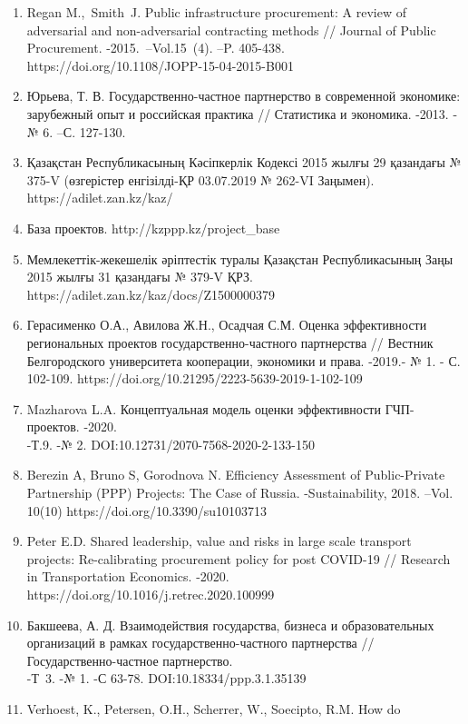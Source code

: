 \begin{enumerate}
\def\labelenumi{\arabic{enumi}.}
\item
  Regan M.,~Smith~J. Public infrastructure procurement: A review of
  adversarial and non-adversarial contracting methods // Journal of
  Public Procurement. -2015.~--Vol.15~(4). --P. 405-438.
  https://doi.org/10.1108/JOPP-15-04-2015-B001
\item
  Юрьева, Т. В. Государственно-частное партнерство в современной
  экономике: зарубежный опыт и российская практика // Статистика и
  экономика. -2013. -№ 6. --С. 127-130.
\item
  Қазақстан Республикасының Кәсіпкерлік Кодексі 2015 жылғы 29 қазандағы
  № 375-V (өзгерістер енгізілді-ҚР 03.07.2019 № 262-VI Заңымен).
  https://adilet.zan.kz/kaz/
\item
  База проектов. http://kzppp.kz/project\_base
\item
  Мемлекеттік-жекешелік әріптестік туралы Қазақстан Республикасының Заңы
  2015 жылғы 31 қазандағы № 379-V ҚРЗ.
  https://adilet.zan.kz/kaz/docs/Z1500000379
\item
  Герасименко О.А., Авилова Ж.Н., Осадчая С.М. Оценка эффективности
  региональных проектов государственно-частного партнерства // Вестник
  Белгородского университета кооперации, экономики и права. -2019.- № 1.
  - С. 102-109. https://doi.org/10.21295/2223-5639-2019-1-102-109
\item
  Mazharova L.A. Концептуальная модель оценки эффективности
  ГЧП-проектов. -2020.\\
  -Т.9. -№ 2. DOI:10.12731/2070-7568-2020-2-133-150
\item
  Berezin A, Bruno S, Gorodnova N. Efficiency Assessment of
  Public-Private Partnership (PPP) Projects: The Case of Russia.
  -Sustainability, 2018. --Vol. 10(10)
  https://doi.org/10.3390/su10103713
\item
  Peter E.D. Shared leadership, value and risks in large scale transport
  projects: Re-calibrating procurement policy for post COVID-19 //
  Research in Transportation Economics. -2020.
  https://doi.org/10.1016/j.retrec.2020.100999
\item
  Бакшеева, А. Д. Взаимодействия государства, бизнеса и образовательных
  организаций в рамках государственно-частного партнерства //
  Государственно-частное партнерство.\\
  -Т~3. -№ 1. -С 63-78. DOI:10.18334/ppp.3.1.35139
\item
  Verhoest, K., Petersen, O.H., Scherrer, W., Soecipto, R.M. How do

\end{enumerate}

